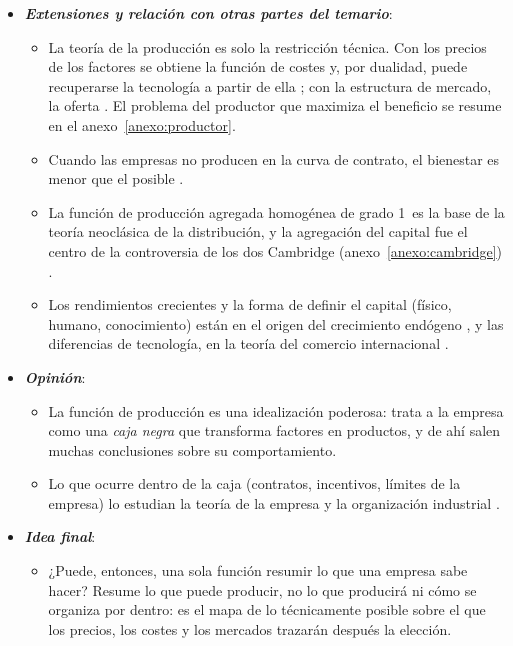\documentclass[11pt]{article}
\begin{document}
\begin{itemize}
\begin{itemize}
\begin{itemize}
  \item La neutralidad de  sostiene el crecimiento equilibrado , y los rendimientos crecientes abren el crecimiento endógeno  y la nueva teoría del comercio .
  \end{itemize}
  \end{itemize}
\item \textbf{\emph{Extensiones y relación con otras partes del temario}}:
  \begin{itemize}
  \item La teoría de la producción es solo la restricción técnica. Con los precios de los factores se obtiene la función de costes y, por dualidad, puede recuperarse la tecnología a partir de ella ; con la estructura de mercado, la oferta . El problema del productor que maximiza el beneficio se resume en el anexo~\ref{anexo:productor}.
  \item Cuando las empresas no producen en la curva de contrato, el bienestar es menor que el posible .
  \item La función de producción agregada homogénea de grado 1~es la base de la teoría neoclásica de la distribución, y la agregación del capital fue el centro de la controversia de los dos Cambridge (anexo~\ref{anexo:cambridge}) .
  \item Los rendimientos crecientes y la forma de definir el capital (físico, humano, conocimiento) están en el origen del crecimiento endógeno , y las diferencias de tecnología, en la teoría del comercio internacional  .
  \end{itemize}
\item \textbf{\emph{Opinión}}:
  \begin{itemize}
  \item La función de producción es una idealización poderosa: trata a la empresa como una \emph{caja negra} que transforma factores en productos, y de ahí salen muchas conclusiones sobre su comportamiento.
  \item Lo que ocurre dentro de la caja (contratos, incentivos, límites de la empresa) lo estudian la teoría de la empresa y la organización industrial .
  \end{itemize}
\item \textbf{\emph{Idea final}}:
  \begin{itemize}
  \item ¿Puede, entonces, una sola función resumir lo que una empresa sabe hacer? Resume lo que puede producir, no lo que producirá ni cómo se organiza por dentro: es el mapa de lo técnicamente posible sobre el que los precios, los costes y los mercados trazarán después la elección.


\end{itemize}
\end{itemize}
\end{document}
